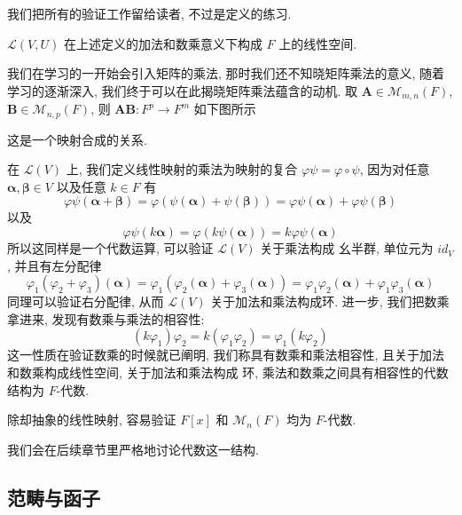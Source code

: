 \documentclass[UTF8]{book}
\begin{document}
我们把所有的验证工作留给读者, 不过是定义的练习. 

\begin{exercise}
    $\mathcal{L}(V,U)$ 在上述定义的加法和数乘意义下构成 $F$ 上的线性空间. 
\end{exercise}

我们在学习的一开始会引入矩阵的乘法, 那时我们还不知晓矩阵乘法的意义, 
随着学习的逐渐深入, 我们终于可以在此揭晓矩阵乘法蕴含的动机. 
取 $\boldsymbol{A} \in \mathcal{M}_{m,n}(F)$, 
$\boldsymbol{B} \in \mathcal{M}_{n,p}(F)$, 
则 $\boldsymbol{AB}: F^p \to F^m$ 如下图所示 
\begin{center}
\end{center}
这是一个映射合成的关系. 

在 $\mathcal{L}(V)$ 上, 我们定义线性映射的乘法为映射的复合 
$\varphi \psi = \varphi \circ \psi$, 
因为对任意 $\boldsymbol{\alpha},\boldsymbol{\beta} \in V$ 
以及任意 $k \in F$ 有 
$$ \varphi \psi(\boldsymbol{\alpha}+\boldsymbol{\beta}) 
= \varphi(\psi(\boldsymbol{\alpha})+\psi(\boldsymbol{\beta}))
= \varphi\psi(\boldsymbol{\alpha}) + \varphi \psi(\boldsymbol{\beta})$$
以及 
$$ \varphi \psi(k\boldsymbol{\alpha}) = 
\varphi( k\psi(\boldsymbol{\alpha})) =k \varphi \psi(\boldsymbol{\alpha})$$
所以这同样是一个代数运算, 可以验证 $\mathcal{L}(V)$ 关于乘法构成 
幺半群, 单位元为 $id_V$, 并且有左分配律
$$ \varphi_1(\varphi_2 + \varphi_3)(\boldsymbol{\alpha})
= \varphi_1 (\varphi_2(\boldsymbol{\alpha})+\varphi_3(\boldsymbol{\alpha}))
=  \varphi_1\varphi_2(\boldsymbol{\alpha}) +\varphi_1\varphi_3(\boldsymbol{\alpha}) $$
同理可以验证右分配律, 
从而 $\mathcal{L}(V)$ 关于加法和乘法构成环. 
进一步, 我们把数乘拿进来, 发现有数乘与乘法的相容性: 
$$ (k\varphi_1)\varphi_2 = k(\varphi_1 \varphi_2) = \varphi_1(k\varphi_2)$$
这一性质在验证数乘的时候就已阐明, 
我们称具有数乘和乘法相容性, 且关于加法和数乘构成线性空间, 关于加法和乘法构成
环, 乘法和数乘之间具有相容性的代数结构为 
$F$-代数. 

除却抽象的线性映射, 容易验证 $F[x]$ 和 $\mathcal{M}_n(F)$ 均为 $F$-代数. 

我们会在后续章节里严格地讨论代数这一结构. 



\subsection{范畴与函子}
\end{document}
